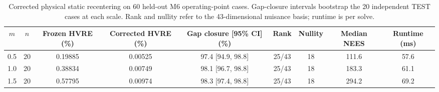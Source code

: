 \begin{table}[t]
\caption{Corrected physical static recentering on 60 held-out M6 operating-point cases. Gap-closure intervals bootstrap the 20 independent TEST cases at each scale. Rank and nullity refer to the 43-dimensional nuisance basis; runtime is per solve.}
\label{tab:e06h-results}
\centering
\footnotesize
\begin{tabular}{ccccccccc}
\toprule
$m$ & $n$ & Frozen HVRE (\%) & Corrected HVRE (\%) & Gap closure [95\% CI] (\%) & Rank & Nullity & Median NEES & Runtime (ms) \\
\midrule
0.5 & 20 & 0.19885 & 0.00525 & 97.4 [94.9, 98.8] & 25/43 & 18 & 111.6 & 57.6 \\
1.0 & 20 & 0.38834 & 0.00749 & 98.1 [96.7, 98.8] & 25/43 & 18 & 183.3 & 61.1 \\
1.5 & 20 & 0.57795 & 0.00974 & 98.3 [97.4, 98.8] & 25/43 & 18 & 294.2 & 69.2 \\
\bottomrule
\end{tabular}
\end{table}
